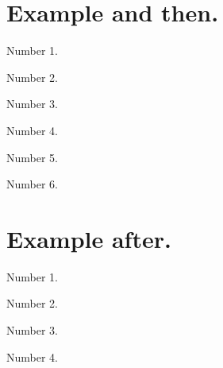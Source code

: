 \documentclass[10pt, a4paper]{../main/main}
\begin{document}
\section{Example and then.}

\begin{tdocexa}
    Number 1.
\end{tdocexa}

\begin{tdocexa}
    Number 2.
\end{tdocexa}

\begin{tdocrem}
    Number 3.
\end{tdocrem}

\begin{tdocexa}
    Number 4.
\end{tdocexa}

\begin{tdocrem}
    Number 5.
\end{tdocrem}

\begin{tdocrem}
    Number 6.
\end{tdocrem}


\section{Example after.}

\begin{tdocrem}
    Number 1.
\end{tdocrem}

\begin{tdocrem}
    Number 2.
\end{tdocrem}

\begin{tdocrem}
    Number 3.
\end{tdocrem}

\begin{tdocexa}
    Number 4.
\end{tdocexa}
\end{document}
